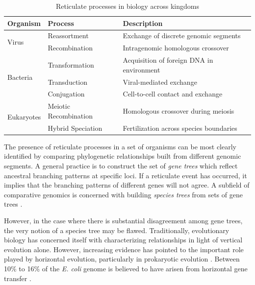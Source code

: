 \begin{table}
\centering
\caption[Reticulate processes in biology across kingdoms]{Reticulate processes in biology across kingdoms}
\begin{tabularx}{\textwidth}{lll}
\toprule
Organism & Process & Description \\
\midrule
\multirow{2}{*}{Virus} & Reassortment & Exchange of discrete genomic segments \\
                       & Recombination & Intragenomic homologous crossover \\
\midrule
\multirow{3}{*}{Bacteria} & Transformation & Acquisition of foreign DNA in environment \\
                          & Transduction   & Viral-mediated exchange \\
                          & Conjugation    & Cell-to-cell contact and exchange \\
\midrule
\multirow{2}{*}{Eukaryotes} & Meiotic Recombination & Homologous crossover during meiosis \\
                            & Hybrid Speciation         & Fertilization across species boundaries \\
\bottomrule
\end{tabularx}
\label{table:reticulation_processes}
\end{table}

The presence of reticulate processes in a set of organisms can be most clearly identified by comparing phylogenetic relationships built from different genomic segments.
A general practice is to construct the set of \emph{gene trees} which reflect ancestral branching patterns at specific loci.
If a reticulate event has occurred, it implies that the branching patterns of different genes will not agree.
A subfield of comparative genomics is concerned with building \emph{species trees} from sets of gene trees \cite{Maddison:1997ew}.

However, in the case where there is substantial disagreement among gene trees, the very notion of a species tree may be flawed.
Traditionally, evolutionary biology has concerned itself with characterizing relationships in light of vertical evolution alone.
However, increasing evidence has pointed to the important role played by horizontal evolution, particularly in prokaryotic evolution \cite{Gogarten:2005da,Gogarten:2002us}.
Between 10\% to 16\% of the \emph{E. coli} genome is believed to have arisen from horizontal gene transfer \cite{Ochman:2000dr}.

